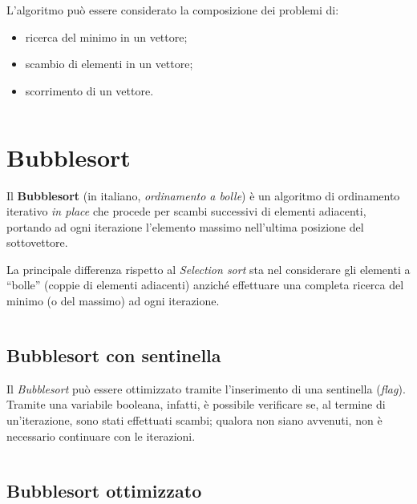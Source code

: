   \noindent{} L'algoritmo può essere considerato la composizione dei problemi di:
  \begin{itemize}[noitemsep]
    \item ricerca del minimo in un vettore;
    \item scambio di elementi in un vettore;
    \item scorrimento di un vettore.
  \end{itemize}

  \inputminted[firstline=3,lastline=23]{cpp}{./src/main/cpp/Selection.cpp}

  \section{Bubblesort}\label{sec:bubble}

  Il \textbf{Bubblesort} (in italiano, \textit{ordinamento a bolle})
  è un algoritmo di ordinamento iterativo \textit{in place} che procede per scambi successivi di elementi adiacenti,
  portando ad ogni iterazione l’elemento massimo nell'ultima posizione del sottovettore.

  La principale differenza rispetto al \textit{Selection sort} sta nel considerare gli elementi a ``bolle''
  (coppie di elementi adiacenti) anziché effettuare una completa ricerca del minimo (o del massimo) ad ogni iterazione.

  \inputminted[firstline=3,lastline=19]{cpp}{./src/main/cpp/Bubble.cpp}

  \clearpage

  \subsection{Bubblesort con sentinella}\label{subsec:bubble:flag}

  Il \textit{Bubblesort} può essere ottimizzato tramite l'inserimento di una sentinella (\textit{flag}).
  Tramite una variabile booleana, infatti, è possibile verificare se, al termine di un'iterazione,
  sono stati effettuati scambi; qualora non siano avvenuti, non è necessario continuare con le iterazioni.

  \inputminted[firstline=37,lastline=60]{cpp}{./src/main/cpp/Bubble.cpp}

  \clearpage

  \subsection{Bubblesort ottimizzato}\label{subsec:bubble:opt}


